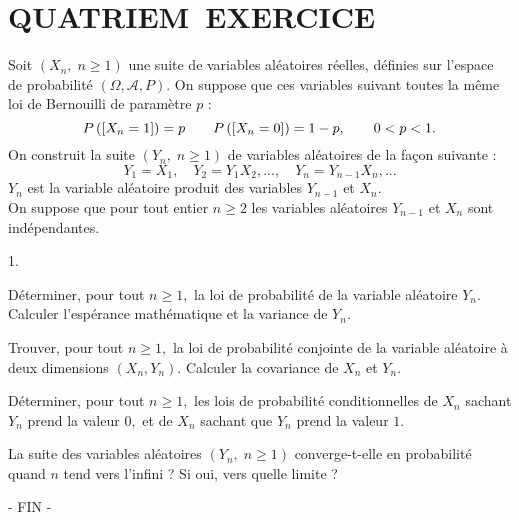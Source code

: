 \documentclass[11pt]{article}%
\begin{document}
\section*{QUATRIEM\E\ EXERCICE}

Soit $(X_{n},\;n\geq 1)$ une suite de variables aléatoires réelles,
définies sur l'espace de probabilité $(\Omega,\mathcal{A},P).$ On
suppose que
ces variables suivant toutes la même loi de Bernouilli de paramètre $p$
:
\[
P\left(\left[ {X_{n} = 1} \right]\right) = p\qquad P\left(\left[ {X_{n} = 0} \right]\right) =
1-p,\qquad 0<p<1.
\]
On construit la suite $(Y_{n},\;n\geq 1)$ de variables aléatoires de la
façon suivante :
\[
Y_{1} = X_{1},\quad Y_{2} = Y_{1}X_{2},...,\quad Y_{n} =
Y_{n-1}X_{n},...
\]
$Y_{n}$ est la variable aléatoire produit des variables $Y_{n-1}$ et
$X_{n}.$\\
On suppose que pour tout entier $n\geq 2$ les variables aléatoires
$Y_{n-1}$ et $X_{n}$ sont indépendantes.

\begin{noliste}{1.}
 \setlength{\itemsep}{4mm}
\item Déterminer, pour tout $n\geq 1,$ la loi de probabilité de la
variable aléatoire $Y_{n}.$\\
Calculer l'espérance mathématique et la variance de $Y_{n}.$

\item Trouver, pour tout $n\geq 1,$ la loi de probabilité conjointe de
la variable aléatoire à deux dimensions $(X_{n},Y_{n}).$ Calculer la
covariance de $X_{n}$ et $Y_{n}.$

\item Déterminer, pour tout $n\geq 1,$ les lois de probabilité
conditionnelles de $X_{n}$ sachant $Y_{n}$ prend la valeur $0,$ et de
$X_{n}$
sachant que $Y_{n}$ prend la valeur $1.$

\item La suite des variables aléatoires $(Y_{n},\;n\geq 1)$
converge-t-elle en probabilité quand $n$ tend vers l'infini ? Si oui,
vers
quelle limite ?
\end{noliste}

\begin{center}
- FIN -
\end{center}

\label{fin}
\end{document}
